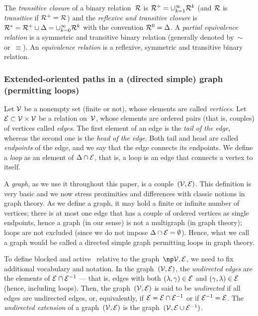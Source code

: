 \documentclass[12pt]{article}
\begin{document}
The \emph{transitive closure} of a binary relation~$\mathcal{R}$ is
\( \mathcal{R}^{+} = \cup_{k=1}^{\infty} \mathcal{R}^{k} \)
(and $\mathcal{R}$ is  \emph{transitive} if \( \mathcal{R}^{+}=\mathcal{R} \))
and the \emph{reflexive and transitive closure} is 
\( \mathcal{R}^{*}= \mathcal{R}^{+} \cup
\Delta = \cup_{k=0}^{\infty} \mathcal{R}^{k} \) with the convention $\mathcal{R}^0=\Delta$. 
% 
A \emph{partial equivalence relation} is a symmetric and transitive binary
relation (generally denoted by~$\sim$ or~$\equiv$).
An \emph{equivalence relation} is a reflexive, symmetric and transitive binary
relation. 
{\small 
{}
}

\subsubsection{Extended-oriented paths in a (directed simple) graph (permitting loops)}

Let ${\cal V}$ be a nonempty set (finite or not), whose elements are called \emph{vertices}.  Let
\( {\cal E} \subset {\cal V}\times{\cal V} \) be a relation on~${\cal V}$, whose
elements are ordered pairs (that is, couples) of vertices called \emph{edges}.
The first element of an edge is the \emph{tail of the edge},
whereas the second one is the \emph{head of the edge}.
Both tail and head are called \emph{endpoints} of the edge,
and we say that the edge connects its endpoints.
We define a \emph{loop} %
as an element of \( \Delta \cap {\cal E} \), that is, a loop is an edge that
connects a vertex to itself.

A \emph{graph}, as we use it throughout this paper, is a
couple~$({\cal V},{\cal E})$.
This definition is very basic and we now stress proximities and differences with
classic notions in graph theory.
As we define a graph, it may hold a finite or infinite number of vertices;
there is at most one edge that has a couple of ordered vertices as single endpoints,
hence a graph (in our sense) is not a multigraph (in graph theory);
loops are not excluded (since we do not impose $\Delta \cap {\cal E}=\emptyset$).
Hence, what we call a graph would be called a directed simple graph permitting
loops in graph theory. 


To define blocked and active \undirectedEdgePaths\ relative to the
graph~\( \npOrientedGraph \), we need to fix additional vocabulary and
notation.
In the graph~$({\cal V},{\cal E})$, 
the \emph{undirected edges} are the elements of ${\cal E} \cap {\cal E}^{-1}$
--- that is, edges with both $(\lambda,\gamma)\in {\cal E}$
and $(\gamma, \lambda)\in {\cal E}$ (hence, including loops).
Then, the graph~$({\cal V},{\cal E})$ is said to be \emph{undirected} if
all edges are undirected edges, 
or, equivalently, if \( {\cal E}={\cal E} \cap {\cal E}^{-1} \)
or if \( {\cal E}^{-1} = {\cal E} \).
The \emph{undirected extension} of a graph~$({\cal V},{\cal E})$
is the graph~$({\cal V},{\cal E} \cup {\cal E}^{-1})$.
\end{document}
